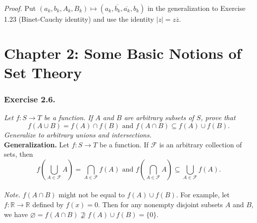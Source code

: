 \documentclass{article}
\begin{document}
\emph{Proof.}
Put $(a_k, b_k, A_k, B_k) \mapsto (a_k, \overline{b_k}, \overline{a_k}, b_k)$
in the generalization to Exercise 1.23 (Binet-Cauchy identity) and use
the identity $|z| = z \overline{z}$.






\newpage
\section*{Chapter 2: Some Basic Notions of Set Theory \\}



\subsubsection*{Exercise 2.6.}
\emph{Let $f: S \rightarrow T$ be a function.
If $A$ and $B$ are arbitrary subsets of $S$, prove that
$$f(A \cup B) = f(A) \cap f(B) \text{ and }
f(A \cap B) \subseteq f(A) \cup f(B).$$
Generalize to arbitrary unions and intersections.} \\

\textbf{Generalization.}
Let $f: S \rightarrow T$ be a function.
If $\mathscr{F}$ is an arbitrary collection of sets, then
$$f\left( \bigcup_{A \in \mathscr{F}} A \right)
= \bigcap_{A \in \mathscr{F}} f(A) \text{ and }
f\left( \bigcap_{A \in \mathscr{F}} A \right)
\subseteq \bigcup_{A \in \mathscr{F}} f(A).$$ \\

\emph{Note.}
$f(A \cap B)$ might not be equal to $f(A) \cup f(B)$.
For example, let $f: \mathbb{R} \rightarrow \mathbb{R}$ defined by $f(x) = 0$.
Then for any nonempty disjoint subsets $A$ and $B$,
we have $\varnothing = f(A \cap B) \not\supseteq f(A) \cup f(B) = \{0\}$. \\
\end{document}
